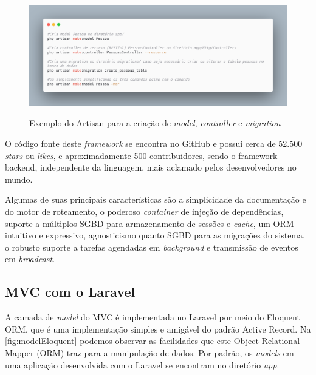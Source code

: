 \begin{figure}[H]
    \centering
    \caption{Exemplo do Artisan para a criação de \textit{model}, \textit{controller} e \textit{migration}}
    \includegraphics[width=13cm]{dados/figuras/php_artisan_make_model.png}
    \label{fig:artisanModel}
\end{figure}

O código fonte deste \textit{framework} se encontra no GitHub e possui cerca de 52.500 \textit{stars} ou \textit{likes}, e aproximadamente 500 contribuidores, sendo o framework backend, independente da linguagem, mais aclamado pelos desenvolvedores no mundo.

Algumas de suas principais características são a simplicidade da documentação e do motor de roteamento, o poderoso \textit{container} de injeção de dependências, suporte a múltiplos SGBD para armazenamento de sessões e \textit{cache}, um ORM intuitivo e expressivo, agnosticismo quanto SGBD para as migrações do sistema, o robusto suporte a tarefas agendadas em \textit{background} e transmissão de eventos em \textit{broadcast}.

\subsection{MVC com o Laravel}
\label{sub:mvclaravel}

A camada de \textit{model} do MVC é implementada no Laravel por meio do Eloquent ORM, que é uma implementação simples e amigável do padrão Active Record. Na \autoref{fig:modelEloquent} podemos observar as facilidades que este Object-Relational Mapper (ORM) traz para a manipulação de dados. Por padrão, os \textit{models} em uma aplicação desenvolvida com o Laravel se encontram no diretório \textit{app}.

